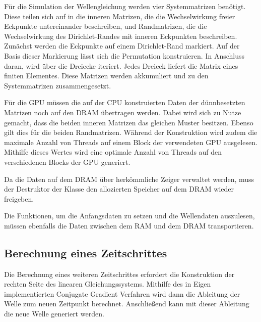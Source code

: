 \documentclass[crop=false,10pt,ngerman]{standalone}
\begin{document}
      Für die Simulation der Wellengleichung werden vier Systemmatrizen benötigt.
      Diese teilen sich auf in die inneren Matrizen, die die Wechselwirkung freier Eckpunkte untereinander beschreiben, und Randmatrizen, die die Wechselwirkung des Dirichlet-Randes mit inneren Eckpunkten beschreiben.
      Zunächst werden die Eckpunkte auf einem Dirichlet-Rand markiert.
      Auf der Basis dieser Markierung lässt sich die Permutation konstruieren.
      In Anschluss daran, wird über die Dreiecke iteriert.
      Jedes Dreieck liefert die Matrix eines finiten Elementes.
      Diese Matrizen werden akkumuliert und zu den Systemmatrizen zusammengesetzt.

      Für die GPU müssen die auf der CPU konstruierten Daten der dünnbesetzten Matrizen noch auf den DRAM übertragen werden.
      Dabei wird sich zu Nutze gemacht, dass die beiden inneren Matrizen das gleichen Muster besitzen.
      Ebenso gilt dies für die beiden Randmatrizen.
      Während der Konstruktion wird zudem die maximale Anzahl von Threads auf einem Block der verwendeten GPU ausgelesen.
      Mithilfe dieses Wertes wird eine optimale Anzahl von Threads auf den verschiedenen Blocks der GPU generiert.

      Da die Daten auf dem DRAM über herkömmliche Zeiger verwaltet werden, muss der Destruktor der Klasse den allozierten Speicher auf dem DRAM wieder freigeben.

      Die Funktionen, um die Anfangsdaten zu setzen und die Wellendaten auszulesen, müssen ebenfalls die Daten zwischen dem RAM und dem DRAM transportieren.

    \subsection{Berechnung eines Zeitschrittes} %
    \label{sub:konstruktion_des_linearen_gleichungssystems}
      Die Berechnung eines weiteren Zeitschrittes erfordert die Konstruktion der rechten Seite des linearen Gleichungssystems.
      Mithilfe des in Eigen implementierten Conjugate Gradient Verfahren wird dann die Ableitung der Welle zum neuen Zeitpunkt berechnet.
      Anschließend kann mit dieser Ableitung die neue Welle generiert werden.
\end{document}
